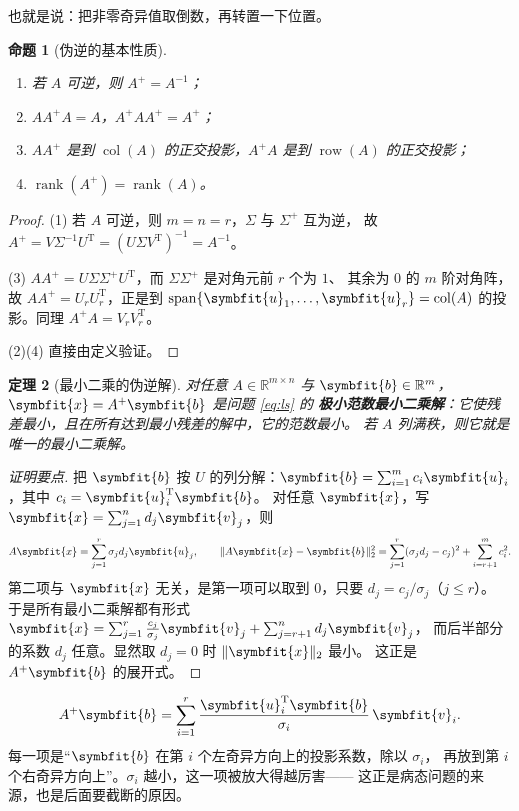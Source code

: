 \documentclass[UTF8, 11pt, a4paper, fontset=windows]{ctexart}
\theoremstyle{cnthm}
\newtheorem{thm}{定理}[section]
\newtheorem{prop}[thm]{命题}
\theoremstyle{cndef}
\newcommand{\T}{^{\mathrm{T}}}
\newcommand{\R}{\mathbb{R}}
\newcommand{\nrm}[1]{\lVert #1 \rVert}
\DeclareMathOperator{\rank}{rank}
\DeclareMathOperator{\Span}{span}
\DeclareMathOperator{\Col}{col}
\DeclareMathOperator{\Row}{row}
\newcommand{\bu}{\symbfit{u}}
\newcommand{\x}{\symbfit{x}}
\newcommand{\bb}{\symbfit{b}}
\newcommand{\vv}{\symbfit{v}}
\begin{document}
也就是说：把非零奇异值取倒数，再转置一下位置。

\begin{prop}[伪逆的基本性质]\label{prop:pinv-prop}

\begin{enumerate}
  \item 若 $A$ 可逆，则 $A^{+}=A^{-1}$；
  \item $AA^{+}A=A$，$A^{+}AA^{+}=A^{+}$；
  \item $AA^{+}$ 是到 $\Col(A)$ 的正交投影，$A^{+}A$ 是到 $\Row(A)$ 的正交投影；
  \item $\rank(A^{+})=\rank(A)$。
\end{enumerate}
\end{prop}

\begin{proof}
(1) 若 $A$ 可逆，则 $m=n=r$，$\Sigma$ 与 $\Sigma^{+}$ 互为逆，
故 $A^{+}=V\Sigma^{-1}U\T=(U\Sigma V\T)^{-1}=A^{-1}$。

(3) $AA^{+}=U\Sigma\Sigma^{+}U\T$，而 $\Sigma\Sigma^{+}$ 是对角元前 $r$ 个为 $1$、
其余为 $0$ 的 $m$ 阶对角阵，故 $AA^{+}=U_rU_r\T$，正是到
$\Span\{\bu_1,\dots,\bu_r\}=\Col(A)$ 的投影。同理 $A^{+}A=V_rV_r\T$。

(2)(4) 直接由定义验证。
\end{proof}

\begin{thm}[最小二乘的伪逆解]\label{thm:pinv-ls}
对任意 $A\in\R^{m\times n}$ 与 $\bb\in\R^{m}$，$\x=A^{+}\bb$ 是问题 \eqref{eq:ls} 的
\textbf{极小范数最小二乘解}：它使残差最小，且在所有达到最小残差的解中，它的范数最小。
若 $A$ 列满秩，则它就是唯一的最小二乘解。
\end{thm}

\begin{proof}[证明要点]
把 $\bb$ 按 $U$ 的列分解：$\bb=\sum_{i=1}^{m}c_i\bu_i$，其中 $c_i=\bu_i\T\bb$。
对任意 $\x$，写 $\x=\sum_{j=1}^{n}d_j\vv_j$，则
\begin{equation}
  A\x=\sum_{j=1}^{r}\sigma_jd_j\bu_j,\qquad
  \nrm{A\x-\bb}_2^2=\sum_{j=1}^{r}(\sigma_jd_j-c_j)^2+\sum_{i=r+1}^{m}c_i^2 .
\end{equation}
第二项与 $\x$ 无关，是第一项可以取到 $0$，只要 $d_j=c_j/\sigma_j$（$j\le r$）。
于是所有最小二乘解都有形式
$\x=\sum_{j=1}^{r}\frac{c_j}{\sigma_j}\vv_j+\sum_{j=r+1}^{n}d_j\vv_j$，
而后半部分的系数 $d_j$ 任意。显然取 $d_j=0$ 时 $\nrm{\x}_2$ 最小。
这正是 $A^{+}\bb$ 的展开式。
\end{proof}

\begin{keybox}[伪逆解的展开式]
\begin{equation*}
  A^{+}\bb=\sum_{i=1}^{r}\frac{\bu_i\T\bb}{\sigma_i}\,\vv_i .
\end{equation*}
每一项是“$\bb$ 在第 $i$ 个左奇异方向上的投影系数，除以 $\sigma_i$，
再放到第 $i$ 个右奇异方向上”。$\sigma_i$ 越小，这一项被放大得越厉害——
这正是病态问题的来源，也是后面要截断的原因。
\end{keybox}
\end{document}
